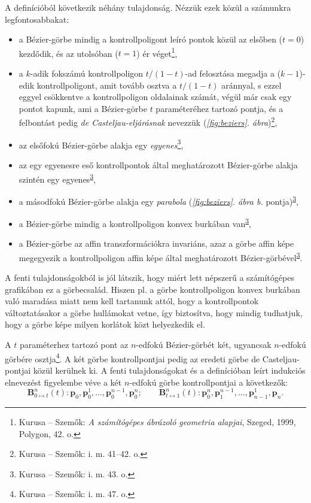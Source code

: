 \documentclass[12pt]{report}
\theoremstyle{definition}
\begin{document}
A definícióból következik néhány tulajdonság. Nézzük ezek közül a számunkra
legfontosabbakat:
\begin{itemize}[noitemsep,topsep=0pt]
  \item a Bézier-görbe mindig a kontrollpoligont leíró pontok közül az elsőben
  ($t=0$) kezdődik, és az utolsóban ($t=1$) ér véget\footnote{Kurusa -- Szemők:
  \emph{A számítógépes ábrázoló geometria alapjai}, Szeged, 1999, Polygon, 42.
  o.},
  \item a $k$-adik fokszámú kontrollpoligon $t/(1-t)$-ad felosztása megadja a
  ($k-1$)-edik kontrollpoligont, amit tovább osztva a $t/(1-t)$ aránnyal, s
  ezzel eggyel csökkentve a kontrollpoligon oldalainak számát, végül már csak
  egy pontot kapunk, ami a Bézier-görbe $t$ paraméteréhez tartozó pontja, és a
  felbontást pedig \emph{de Casteljau-eljárásnak} nevezzük
  (\emph{\ref{fig:beziers}. ábra})\footnote{Kurusa -- Szemők: i. m. 41--42.
  o.},
  \item az elsőfokú Bézier-görbe alakja egy \emph{egyenes}\footnote{Kurusa --
  Szemők: i. m. 43. o.\label{fn:Kurusa:43p}},
  \item az egy egyenesre eső kontrollpontok által meghatározott Bézier-görbe
  alakja szintén egy egyenes\textsuperscript{\ref{fn:Kurusa:43p}},

  \item a másodfokú Bézier-görbe alakja egy \emph{parabola}
  (\emph{\ref{fig:beziers}. ábra b.}
  pontja)\textsuperscript{\ref{fn:Kurusa:43p}},

  \item a Bézier-görbe mindig a kontrollpoligon konvex burkában
  van\textsuperscript{\ref{fn:Kurusa:43p}},

  \item a Bézier-görbe az affin transzformációkra invariáns, azaz a görbe affin
  képe megegyezik a kontrollpoligon affin képe által meghatározott
  Bézier-görbével\textsuperscript{\ref{fn:Kurusa:43p}}.
\end{itemize}

A fenti tulajdonságokból is jól látszik, hogy miért lett népszerű a
számítógépes grafikában ez a görbecsalád. Hiszen pl. a görbe kontrollpoligon
konvex burkában való maradása miatt nem kell tartanunk attól, hogy a
kontrollpontok változtatásakor a görbe hullámokat vetne, így biztosítva, hogy
mindig tudhatjuk, hogy a görbe képe milyen korlátok közt helyezkedik el.

A $t$ paraméterhez tartozó pont az $n$-edfokú Bézier-görbét két, ugyancsak
$n$-edfokú görbére osztja\footnote{Kurusa -- Szemők: i. m. 47. o.}. A két görbe
kontrollpontjai pedig az eredeti görbe de Casteljau-pontjai közül kerülnek ki.
A fenti tulajdonságokat és a definícióban leírt indukciós elnevezést figyelembe
véve a két $n$-edfokú görbe kontrollpontjai a következők:
\begin{equation}\label{eq:1} \boldsymbol{B}_{0\mapsto t}^n(t):
\boldsymbol{p}_0, \boldsymbol{p}_0^1, ..., \boldsymbol{p}_0^{n-1},
\boldsymbol{p}_0^n; \qquad \boldsymbol{B}_{t\mapsto 1}^n(t):
\boldsymbol{p}_0^n, \boldsymbol{p}_1^{n-1}, ..., \boldsymbol{p}_{n-1}^1,
\boldsymbol{p}_n. \end{equation}
\end{document}

